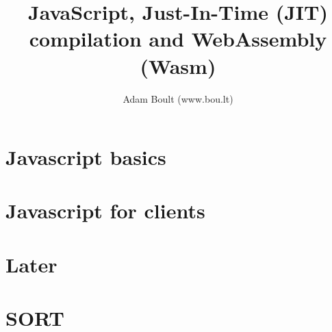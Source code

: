 \documentclass[oneside]{book}
\begin{document}
\author{Adam Boult (www.bou.lt)}
\title{JavaScript, Just-In-Time (JIT) compilation and WebAssembly (Wasm)}
\maketitle

\setcounter{tocdepth}{0}
\tableofcontents



\part{Javascript basics}







\part{Javascript for clients}




\part{Later}


\part{SORT}

\end{document}
